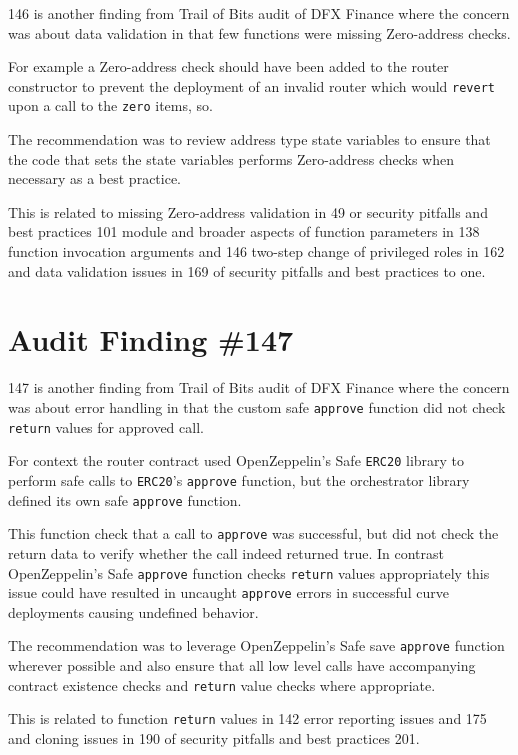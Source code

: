 146 is another finding from Trail of Bits audit of DFX Finance where the concern was about data validation in that few functions were missing Zero-address checks.

For example a Zero-address check should have been added to the router constructor to prevent the deployment of an invalid router which would \verb|revert| upon a call to the \verb|zero| items, so.

The recommendation was to review address type state variables to ensure that the code that sets the state variables performs Zero-address checks when necessary as a best practice.

This is related to missing Zero-address validation in 49 or security pitfalls and best practices 101 module and broader aspects of function parameters in 138 function invocation arguments and 146 two-step change of privileged roles in 162 and data validation issues in 169 of security pitfalls and best practices to one.

\section{Audit Finding \#147}

147 is another finding from Trail of Bits audit of DFX Finance where the concern was about error handling in that the custom safe \verb|approve| function did not check \verb|return| values for approved call. 

For context the router contract used OpenZeppelin's Safe \verb|ERC20| library to perform safe calls to \verb|ERC20|'s \verb|approve| function, but the orchestrator library defined its own safe \verb|approve| function. 

This function check that a call to \verb|approve| was successful, but did not check the return data to verify whether the call indeed returned true. In contrast OpenZeppelin's Safe \verb|approve| function checks \verb|return| values appropriately this issue could have resulted in uncaught \verb|approve| errors in successful curve deployments causing undefined behavior.

The recommendation was to leverage OpenZeppelin's Safe save \verb|approve| function wherever possible and also ensure that all low level calls have accompanying contract existence checks and \verb|return| value checks where appropriate.

This is related to function \verb|return| values in 142 error reporting issues and 175 and cloning issues in 190 of security pitfalls and best practices 201.

